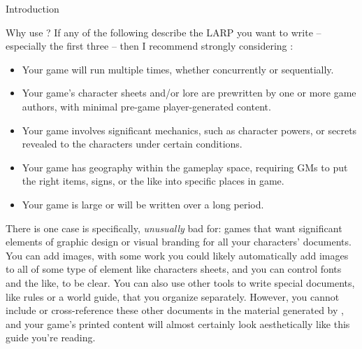 \documentclass[sheet]{GameTexBase}
\begin{document}
\begin{section}{Introduction}
\begin{subsection}{Why use \gametex{}?}
If any of the following describe the LARP you want to write -- especially the first three -- then I recommend strongly considering \gametex{}:
\begin{itemize}
\item Your game will run multiple times, whether concurrently or sequentially.
\item Your game's character sheets and/or lore are prewritten by one or more game authors, with minimal pre-game player-generated content.
\item Your game involves significant mechanics, such as character powers, or secrets revealed to the characters under certain conditions.
\item Your game has geography within the gameplay space, requiring GMs to put the right items, signs, or the like into specific places in game.
\item Your game is large or will be written over a long period.
\end{itemize}

There is one case \gametex{} is specifically, \emph{unusually} bad for: games that want significant elements of graphic design or visual branding for all your characters' documents.  You can add images, with some work you could likely automatically add images to all of some type of element like characters sheets, and you can control fonts and the like, to be clear. You can also use other tools to write special documents, like rules or a world guide, that you organize separately.  However, you cannot include or cross-reference these other documents in the material generated by \gametex{}, and your game's printed content will almost certainly look aesthetically like this guide you're reading.
\end{subsection}
\end{section}
\end{document}
